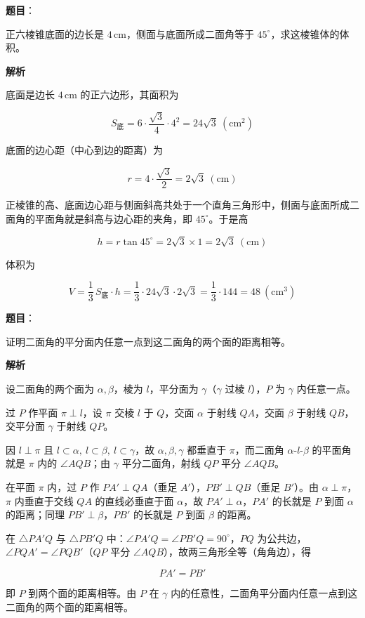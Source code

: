\begin{answer}

\textbf{题目}：

正六棱锥底面的边长是 $4\,\text{cm}$，侧面与底面所成二面角等于 $45^\circ$，求这棱锥体的体积。

\textbf{解析}

底面是边长 $4\,\text{cm}$ 的正六边形，其面积为

\nopagebreak[4]
\[
S_{\text{底}}=6\cdot\frac{\sqrt3}{4}\cdot4^2=24\sqrt3\ (\text{cm}^2)
\]

底面的边心距（中心到边的距离）为

\nopagebreak[4]
\[
r=4\cdot\frac{\sqrt3}{2}=2\sqrt3\ (\text{cm})
\]

正棱锥的高、底面边心距与侧面斜高共处于一个直角三角形中，侧面与底面所成二面角的平面角就是斜高与边心距的夹角，即 $45^\circ$。于是高

\nopagebreak[4]
\[
h=r\tan45^\circ=2\sqrt3\times1=2\sqrt3\ (\text{cm})
\]

体积为

\nopagebreak[4]
\[
V=\frac13\,S_{\text{底}}\cdot h=\frac13\cdot24\sqrt3\cdot2\sqrt3=\frac13\cdot144=48\ (\text{cm}^3)
\]


\end{answer}
\begin{answer}

\textbf{题目}：

证明二面角的平分面内任意一点到这二面角的两个面的距离相等。

\textbf{解析}

设二面角的两个面为 $\alpha,\beta$，棱为 $l$，平分面为 $\gamma$（$\gamma$ 过棱 $l$），$P$ 为 $\gamma$ 内任意一点。

过 $P$ 作平面 $\pi\perp l$，设 $\pi$ 交棱 $l$ 于 $Q$，交面 $\alpha$ 于射线 $QA$，交面 $\beta$ 于射线 $QB$，交平分面 $\gamma$ 于射线 $QP$。

因 $l\perp\pi$ 且 $l\subset\alpha,\ l\subset\beta,\ l\subset\gamma$，故 $\alpha,\beta,\gamma$ 都垂直于 $\pi$，而二面角 $\alpha\text{-}l\text{-}\beta$ 的平面角就是 $\pi$ 内的 $\angle AQB$；由 $\gamma$ 平分二面角，射线 $QP$ 平分 $\angle AQB$。

在平面 $\pi$ 内，过 $P$ 作 $PA'\perp QA$（垂足 $A'$），$PB'\perp QB$（垂足 $B'$）。由 $\alpha\perp\pi$，$\pi$ 内垂直于交线 $QA$ 的直线必垂直于面 $\alpha$，故 $PA'\perp\alpha$，$PA'$ 的长就是 $P$ 到面 $\alpha$ 的距离；同理 $PB'\perp\beta$，$PB'$ 的长就是 $P$ 到面 $\beta$ 的距离。

在 $\triangle PA'Q$ 与 $\triangle PB'Q$ 中：$\angle PA'Q=\angle PB'Q=90^\circ$，$PQ$ 为公共边，$\angle PQA'=\angle PQB'$（$QP$ 平分 $\angle AQB$），故两三角形全等（角角边），得

\nopagebreak[4]
\[
PA'=PB'
\]

即 $P$ 到两个面的距离相等。由 $P$ 在 $\gamma$ 内的任意性，二面角平分面内任意一点到这二面角的两个面的距离相等。


\end{answer}